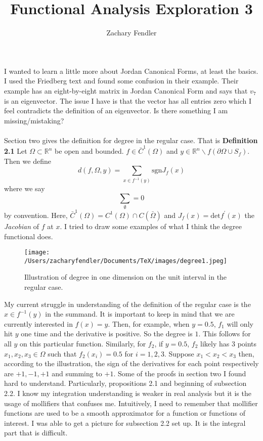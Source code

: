 \documentclass[reqno, 12pt]{article}
\title{Functional Analysis Exploration 3}
\author{Zachary Fendler}
\newcommand{\R}{\mathbb{R}}
\begin{document}
\maketitle
I wanted to learn a little more about Jordan Canonical Forms, at least the basics. I used the Friedberg text and found some confusion in their example. Their example has an eight-by-eight matrix in Jordan Canonical Form and says that $v_7$ is an eigenvector. The issue I have is that the vector has all entries zero which I feel contradicts the definition of an eigenvector. Is there something I am missing/mistaking?
\\\\Section two gives the definition for degree in the regular case. That is
\textbf{Definition 2.1} Let $\Omega \subset \R^n$ be open and bounded. $f \in \bar{C}^1(\Omega)$ and $y \in \R^n\backslash f(\partial\Omega \cup S_f)$. Then we define
$$d(f,\Omega, y) = \sum_{x \in f^{-1}(y)} \text{sgn}J_f(x)$$
where we say $$\sum_{\emptyset} = 0$$ by convention.
Here, $\bar{C}^1(\Omega) = C^1(\Omega) \cap C(\bar{\Omega})$ and $J_f (x) = \text{det}f^{\prime}(x)$ the \textit{Jacobian} of $f$ at $x$.
I tried to draw some examples of what I think the degree functional does.
\begin{figure}[h!]
	\centering
	\texttt{[image: /Users/zacharyfendler/Documents/TeX/images/degree1.jpeg]}
	\caption{Illustration of degree in one dimension on the unit interval in the regular case.}
\end{figure}
My current struggle in understanding of the definition of the regular case is the $x \in f^{-1}(y)$ in the summand. It is important to keep in mind that we are currently interested in $f(x) = y$. Then, for example, when $y=0.5$, $f_1$ will only hit $y$ one time and the derivative is positive. So the degree is $1$. This follows for all $y$ on this particular function. Similarly, for $f_2$, if $y=0.5$, $f_2$ likely has $3$ points $x_1,x_2,x_3 \in \Omega$ such that $f_2(x_i) = 0.5$ for $i = 1,2,3$. Suppose $x_1 < x_2 < x_3$ then, according to the illustration, the sign of the derivatives for each point respectively are $+1, - 1, +1$ and summing to $+1$. Some of the proofs in section two I found hard to understand. Particularly, propositions 2.1 and beginning of subsection 2.2. I know my integration understanding is weaker in real analysis but it is the usage of mollifiers that confuses me. Intuitively, I need to remember that mollifier functions are used to be a smooth approximator for a function or functions of interest. I was able to get a picture for subsection 2.2 set up. It is the integral part that is difficult.
\end{document}
